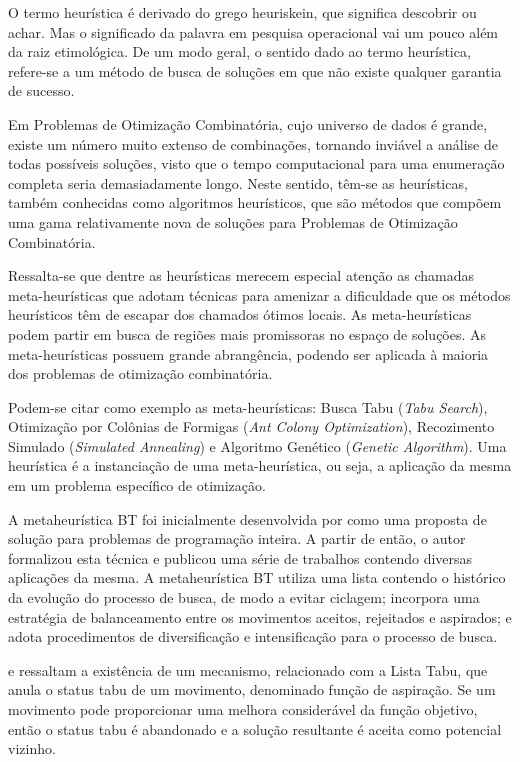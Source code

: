 O termo heurística é derivado do grego heuriskein, que significa descobrir ou achar. Mas o significado da 
palavra em pesquisa operacional vai um pouco além da raiz etimológica. De um modo geral, o sentido dado ao termo heurística, refere-se a um método de busca de soluções em que não existe qualquer garantia de sucesso.\par


\cite{deleonardo} Em Problemas de Otimização Combinatória, cujo universo de dados é grande, existe um número muito extenso de combinações, tornando inviável a análise de todas possíveis soluções, visto que o tempo computacional para uma enumeração completa seria demasiadamente longo. Neste sentido, têm-se as heurísticas, também conhecidas como algoritmos heurísticos, que são métodos que compõem uma gama relativamente nova de soluções para Problemas de Otimização Combinatória. 


Ressalta-se que dentre as heurísticas merecem especial atenção as chamadas meta-heurísticas que adotam técnicas para amenizar a dificuldade que os métodos heurísticos têm de escapar dos chamados ótimos locais. As meta-heurísticas podem partir em busca de regiões mais promissoras no espaço de soluções. As meta-heurísticas possuem grande abrangência, podendo ser aplicada à maioria dos problemas de otimização combinatória.\par

Podem-se citar como exemplo as meta-heurísticas: Busca Tabu (\textit{Tabu Search}), Otimização por Colônias de Formigas (\textit{Ant Colony Optimization}), Recozimento Simulado (\textit{Simulated Annealing}) e Algoritmo Genético (\textit{Genetic Algorithm}). Uma heurística é a instanciação de uma meta-heurística, ou seja, a aplicação da mesma em um problema específico de otimização.\par



A metaheurística BT foi inicialmente desenvolvida por \cite{glover1986future} como uma proposta de
solução para problemas de programação inteira. A partir de então, o autor formalizou esta
técnica e publicou uma série de trabalhos contendo diversas aplicações da mesma. A
metaheurística BT utiliza uma lista contendo o histórico da evolução do processo de busca, de
modo a evitar ciclagem; incorpora uma estratégia de balanceamento entre os movimentos
aceitos, rejeitados e aspirados; e adota procedimentos de diversificação e intensificação para o
processo de busca.\par
\cite{souza2000} e \cite{white2004using} ressaltam a existência de um mecanismo, relacionado com
a Lista Tabu, que anula o status tabu de um movimento, denominado função de aspiração. Se
um movimento pode proporcionar uma melhora considerável da função objetivo, então o
status tabu é abandonado e a solução resultante é aceita como potencial vizinho.

